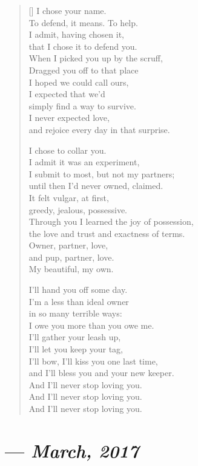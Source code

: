 \begin{verse}[\textwidth]
  I chose your name.\\
  To defend, it means. To help.\\
  I admit, having chosen it,\\
  that I chose it to defend you.\\
  When I picked you up by the scruff,\\
  Dragged you off to that place\\
  I hoped we could call ours,\\
  I expected that we'd\\
  simply find a way to survive.\\
  I never expected love,\\
  and rejoice every day in that surprise.

  I chose to collar you.\\
  I admit it was an experiment,\\
  I submit to most, but not my partners;\\
  until then I'd never owned, claimed.\\
  It felt vulgar, at first,\\
  greedy, jealous, possessive.\\
  Through you I learned the joy of possession,\\
  the love and trust and exactness of terms.\\
  Owner, partner, love,\\
  and pup, partner, love.\\
  My beautiful, my own.

  I'll hand you off some day.\\
  I'm a less than ideal owner\\
  in so many terrible ways:\\
  I owe you more than you owe me.\\
  I'll gather your leash up,\\
  I'll let you keep your tag,\\
  I'll bow, I'll kiss you one last time,\\
  and I'll bless you and your new keeper.\\
  And I'll never stop loving you.\\
  And I'll never stop loving you.\\
  And I'll never stop loving you.
\end{verse}
\newpage

\section{--- \textit{March, 2017}}

